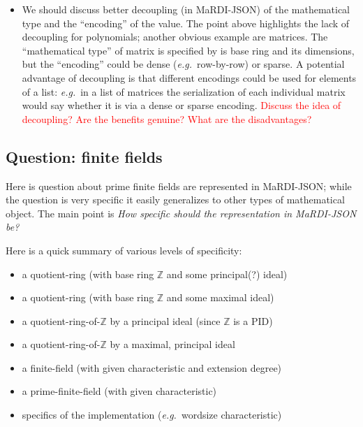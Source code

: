 \documentclass{article}
\newcommand{\MaRDIJSON}{MaRDI-JSON}
\newcommand \eg {\textit{e.g.}}
\newcommand \ZZ {{\mathbb Z}}
\def\red#1{\textcolor{red}{#1}}
\begin{document}
\begin{itemize}

\item We should discuss better decoupling (in {\MaRDIJSON}) of the mathematical
  type and the ``encoding'' of the value.  The point above highlights the lack
  of decoupling for polynomials; another obvious example are matrices.
  The ``mathematical type'' of matrix is specified by is base ring and its
  dimensions, but the ``encoding'' could be dense (\eg~row-by-row) or sparse.
  A potential advantage of decoupling is that different encodings could be
  used for elements of a list: \eg~in a list of matrices the serialization
  of each individual matrix would say whether it is via a dense or sparse
  encoding.  \red{Discuss the idea of decoupling?  Are the benefits genuine?
  What are the disadvantages?}
\end{itemize}


\subsection{Question: finite fields}
\label{sec:QnFiniteFields}

Here is question about prime finite fields are represented in {\MaRDIJSON};
while the question is very specific it easily generalizes to other
types of mathematical object.  The main point is \textit{How specific
  should the representation in {\MaRDIJSON} be?}

Here is a quick summary of various levels of specificity:
\begin{itemize}
\item a quotient-ring (with base ring $\ZZ$ and some principal(?) ideal)
\item a quotient-ring (with base ring $\ZZ$ and some maximal ideal)
\item a quotient-ring-of-$\ZZ$ by a principal ideal (since $\ZZ$ is a PID)
\item a quotient-ring-of-$\ZZ$ by a maximal, principal ideal
\item a finite-field (with given characteristic and extension degree)
\item a prime-finite-field (with given characteristic)
\item specifics of the implementation (\eg~wordsize characteristic)
\end{itemize}
\end{document}
